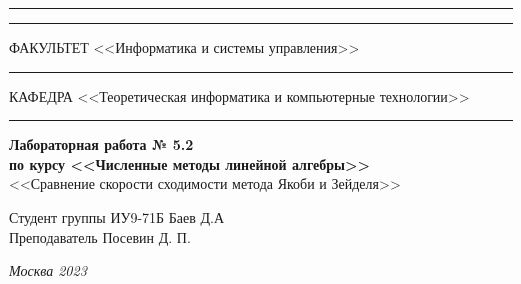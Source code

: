\documentclass[a4paper, 14pt]{extarticle}
\begin{document}
\begin{titlepage}
\vspace{-25pt}
\hspace{-35pt}\rule{\textwidth}{2.3pt}

\vspace*{-20.3pt}
\hspace{-35pt}\rule{\textwidth}{0.4pt}

\vspace{1.5ex}
\hspace{-35pt} \noindent \small ФАКУЛЬТЕТ\hspace{80pt} <<Информатика и системы управления>>

\vspace*{-16pt}
\hspace{47pt}\rule{0.83\textwidth}{0.4pt}

\vspace{0.5ex}
\hspace{-35pt} \noindent \small КАФЕДРА\hspace{50pt} <<Теоретическая информатика и компьютерные технологии>>

\vspace*{-16pt}
\hspace{30pt}\rule{0.866\textwidth}{0.4pt}

\vspace{11em}

\begin{center}
\Large {\bf Лабораторная работа № 5.2} \\
\large {\bf по курсу <<Численные методы линейной алгебры>>} \\
\large <<Сравнение скорости сходимости метода
Якоби и Зейделя>>
\end{center}\normalsize

\vspace{8em}


\begin{flushright}
  {Студент группы ИУ9-71Б Баев Д.А \hspace*{15pt}\\
  \vspace{2ex}
  Преподаватель Посевин Д. П.\hspace*{15pt}}
\end{flushright}

\bigskip

\vfill


\begin{center}
\textsl{Москва 2023}
\end{center}
\end{titlepage}
\end{document}
